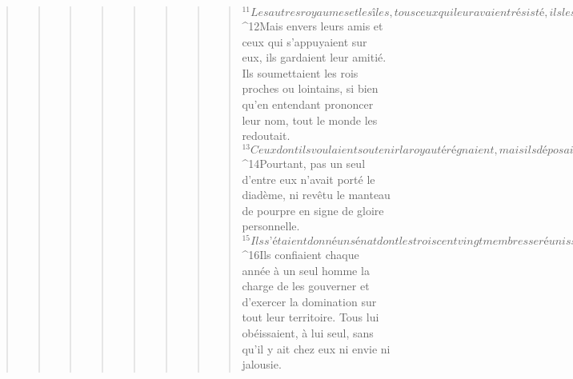 \begin{verse}
\begin{verse}
\begin{verse}
\begin{verse}
\begin{verse}
\begin{verse}
\begin{verse}
\begin{verse}
${}^{11}Les autres royaumes et les îles, tous ceux qui leur avaient résisté, ils les avaient dévastés et asservis. 
${}^{12}Mais envers leurs amis et ceux qui s’appuyaient sur eux, ils gardaient leur amitié. Ils soumettaient les rois proches ou lointains, si bien qu’en entendant prononcer leur nom, tout le monde les redoutait. 
${}^{13}Ceux dont ils voulaient soutenir la royauté régnaient, mais ils déposaient aussi ceux qu’ils voulaient. Ils étaient à l’apogée de leur puissance. 
${}^{14}Pourtant, pas un seul d’entre eux n’avait porté le diadème, ni revêtu le manteau de pourpre en signe de gloire personnelle. 
${}^{15}Ils s’étaient donné un sénat dont les trois cent vingt membres se réunissaient chaque jour pour délibérer en permanence des affaires du peuple et en assurer le bon ordre. 
${}^{16}Ils confiaient chaque année à un seul homme la charge de les gouverner et d’exercer la domination sur tout leur territoire. Tous lui obéissaient, à lui seul, sans qu’il y ait chez eux ni envie ni jalousie.
      

\end{verse}
\end{verse}
\end{verse}
\end{verse}
\end{verse}
\end{verse}
\end{verse}
\end{verse}
